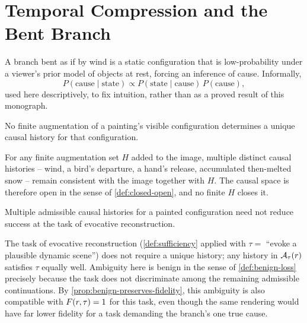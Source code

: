 \section{Temporal Compression and the Bent Branch}

A branch bent as if by wind is a static configuration that is
low-probability under a viewer's prior model of objects at rest, forcing
an inference of cause. Informally,
\[
P(\text{cause} \mid \text{state}) \propto P(\text{state} \mid
\text{cause})\, P(\text{cause}),
\]
used here descriptively, to fix intuition, rather than as a proved result
of this monograph.

\begin{proposition}
\label{prop:open-causal-space}
No finite augmentation of a painting's visible configuration determines
a unique causal history for that configuration.
\end{proposition}

\begin{proofsketch}
For any finite augmentation set $H$ added to the image, multiple distinct
causal histories -- wind, a bird's departure, a hand's release,
accumulated then-melted snow -- remain consistent with the image together
with $H$. The causal space is therefore open in the sense of
\cref{def:closed-open}, and no finite $H$ closes it.
\end{proofsketch}

\begin{proposition}
\label{prop:benign-ambiguity}
Multiple admissible causal histories for a painted configuration need not
reduce success at the task of evocative reconstruction.
\end{proposition}

\begin{proofsketch}
The task of evocative reconstruction (\cref{def:sufficiency} applied with
$\tau = $ ``evoke a plausible dynamic scene'') does not require a unique
history; any history in $\mathcal{A}_{\tau}(r)$ satisfies $\tau$ equally well.
Ambiguity here is benign in the sense of \cref{def:benign-loss} precisely
because the task does not discriminate among the remaining admissible
continuations. By \cref{prop:benign-preserves-fidelity}, this ambiguity
is also compatible with $F(r,\tau) = 1$ for this task, even
though the same rendering would have far lower fidelity for a task
demanding the branch's one true cause.
\end{proofsketch}

